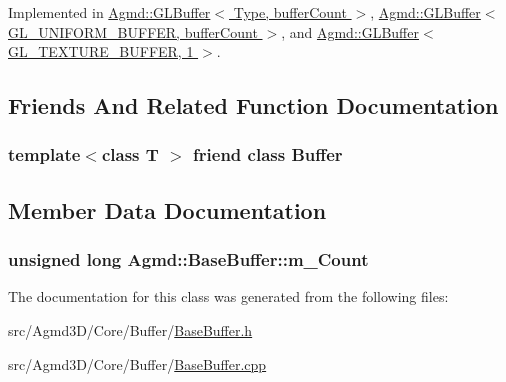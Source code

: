 Implemented in \hyperlink{class_agmd_1_1_g_l_buffer_ab79847088a93b9e0c9ec18acea0dc614}{Agmd\+::\+G\+L\+Buffer$<$ Type, buffer\+Count $>$}, \hyperlink{class_agmd_1_1_g_l_buffer_ab79847088a93b9e0c9ec18acea0dc614}{Agmd\+::\+G\+L\+Buffer$<$ G\+L\+\_\+\+U\+N\+I\+F\+O\+R\+M\+\_\+\+B\+U\+F\+F\+E\+R, buffer\+Count $>$}, and \hyperlink{class_agmd_1_1_g_l_buffer_ab79847088a93b9e0c9ec18acea0dc614}{Agmd\+::\+G\+L\+Buffer$<$ G\+L\+\_\+\+T\+E\+X\+T\+U\+R\+E\+\_\+\+B\+U\+F\+F\+E\+R, 1 $>$}.



\subsection{Friends And Related Function Documentation}
\hypertarget{class_agmd_1_1_base_buffer_a121ba56e0cdc05eea057f3760cc35279}{
\subsubsection[{Buffer}]{\setlength{\rightskip}{0pt plus 5cm}template$<$class T $>$ friend class {\bf Buffer}\hspace{0.3cm}{\ttfamily [friend]}}}\label{class_agmd_1_1_base_buffer_a121ba56e0cdc05eea057f3760cc35279}


\subsection{Member Data Documentation}
\hypertarget{class_agmd_1_1_base_buffer_a74887fc81c30f9546d0ad9afab580919}{
\subsubsection[{m\+\_\+\+Count}]{\setlength{\rightskip}{0pt plus 5cm}unsigned long Agmd\+::\+Base\+Buffer\+::m\+\_\+\+Count\hspace{0.3cm}{\ttfamily [protected]}}}\label{class_agmd_1_1_base_buffer_a74887fc81c30f9546d0ad9afab580919}


The documentation for this class was generated from the following files\+:\begin{DoxyCompactItemize}
\item 
src/\+Agmd3\+D/\+Core/\+Buffer/\hyperlink{_base_buffer_8h}{Base\+Buffer.\+h}\item 
src/\+Agmd3\+D/\+Core/\+Buffer/\hyperlink{_base_buffer_8cpp}{Base\+Buffer.\+cpp}\end{DoxyCompactItemize}
